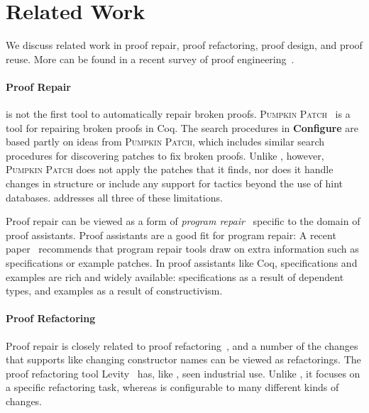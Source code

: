 \section{Related Work}


We discuss related work in proof repair, proof refactoring, proof design, and proof reuse.
More can be found in a recent survey of proof engineering~\cite{PGL-045}.

\paragraph{Proof Repair}

\toolname is not the first tool to automatically repair broken proofs.
\textsc{Pumpkin Patch}~\cite{pumpkinpatch} is a tool for repairing broken proofs in Coq.
The search procedures in \textbf{Configure} are based partly on ideas from \textsc{Pumpkin Patch}, which includes
similar search procedures for discovering patches to fix broken proofs.
Unlike \toolname, however, \textsc{Pumpkin Patch} does not apply the patches that it finds,
nor does it handle changes in structure or include any support for tactics beyond the use of hint databases.
\toolname addresses all three of these limitations.

Proof repair can be viewed as a form of \textit{program repair}~\cite{Monperrus:2018:ASR:3177787.3105906, Gazzola:2018:ASR:3180155.3182526}
specific to the domain of proof assistants.
Proof assistants are a good fit for program repair: A recent paper~\cite{Qi:2015:APP:2771783.2771791} 
recommends that program repair tools draw on extra information
such as specifications or example patches. In proof assistants like Coq, specifications and examples 
are rich and widely available: specifications as a result of dependent types,
and examples as a result of constructivism.

\paragraph{Proof Refactoring}

Proof repair is closely related to proof refactoring~\cite{WhitesidePhD}, and a number of the changes
that \toolname supports like changing constructor names can be viewed as refactorings.
The proof refactoring tool Levity~\cite{Bourke12} has, like \toolname, seen industrial use.
Unlike \toolname, it focuses on a specific refactoring task, whereas \toolname is configurable to many different kinds of changes.

